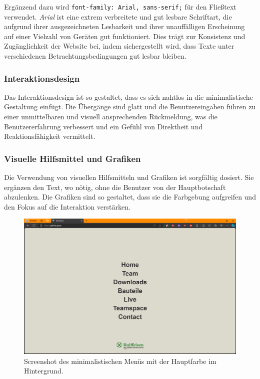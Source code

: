Ergänzend dazu wird \texttt{font-family: Arial, sans-serif;} für den Fließtext verwendet. \textit{Arial} ist eine extrem verbreitete und gut lesbare Schriftart, die aufgrund ihrer ausgezeichneten Lesbarkeit und ihrer unauffälligen Erscheinung auf einer Vielzahl von Geräten gut funktioniert. Dies trägt zur Konsistenz und Zugänglichkeit der Website bei, indem sichergestellt wird, dass Texte unter verschiedenen Betrachtungsbedingungen gut lesbar bleiben.

\subsubsection{Interaktionsdesign}
Das Interaktionsdesign ist so gestaltet, dass es sich nahtlos in die minimalistische Gestaltung einfügt. Die Übergänge sind glatt und die Benutzereingaben führen zu einer unmittelbaren und visuell ansprechenden Rückmeldung, was die Benutzererfahrung verbessert und ein Gefühl von Direktheit und Reaktionsfähigkeit vermittelt.

\subsubsection{Visuelle Hilfsmittel und Grafiken}
Die Verwendung von visuellen Hilfsmitteln und Grafiken ist sorgfältig dosiert. Sie ergänzen den Text, wo nötig, ohne die Benutzer von der Hauptbotschaft abzulenken. Die Grafiken sind so gestaltet, dass sie die Farbgebung aufgreifen und den Fokus auf die Interaktion verstärken.

\begin{figure}[h]
    \centering
    \includegraphics[width=\linewidth]{Resources/menu_screenshot.png}
    \caption{Screenshot des minimalistischen Menüs mit der Hauptfarbe im Hintergrund.}
    \end{figure}


